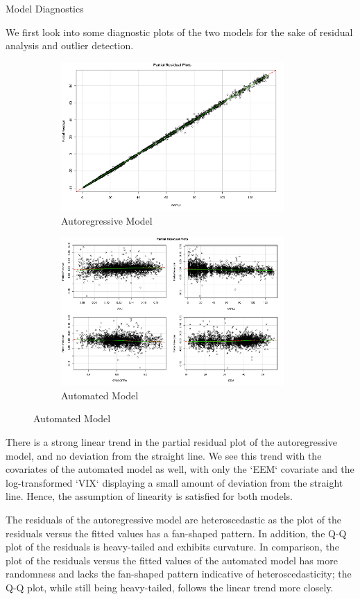 \documentclass[]{article}
\begin{document}
\begin{section}{Model Diagnostics}

We first look into some diagnostic plots of the two models for the sake of residual analysis and outlier detection.

\begin{figure}[H]
\begin{subfigure}{.5\textwidth}
  \includegraphics[width=85mm]{diagnostics/arm_covar_residuals.png}
  \caption{Autoregressive Model}
\end{subfigure}%
\begin{subfigure}{.5\textwidth}
  \includegraphics[width=85mm]{diagnostics/fm_covar_residuals.png}
  \caption{Automated Model}
\end{subfigure}
\end{figure}

There is a strong linear trend in the partial residual plot of the autoregressive model, and no deviation from the straight line. We see this trend with the covariates of the automated model as well, with only the `EEM` covariate and the log-transformed `VIX` displaying a small amount of deviation from the straight line. Hence, the assumption of linearity is satisfied for both models.

The residuals of the autoregressive model are heteroscedastic as the plot of the residuals versus the fitted values has a fan-shaped pattern. In addition, the Q-Q plot of the residuals is heavy-tailed and exhibits curvature. In comparison, the plot of the residuals versus the fitted values of the automated model has more randomness and lacks the fan-shaped pattern indicative of heteroscedasticity; the Q-Q plot, while still being heavy-tailed, follows the linear trend more closely. 


\end{section}
\end{document}
